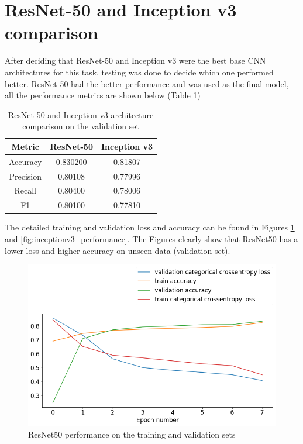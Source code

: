 \documentclass[times, utf8, diplomski]{fer}
\begin{document}
\section{ResNet-50 and Inception v3 comparison}
\label{se:resnet_vs_inception}

After deciding that ResNet-50 and Inception v3 were the best base CNN architectures for this task, testing was done to decide which one performed better. ResNet-50 had the better performance and was used as the final model, all the performance metrics are shown below (Table \ref{tb:resnet_vs_inceptionv3})

\begin{table}
\centering
\caption{ResNet-50 and Inception v3 architecture comparison on the validation set}
\label{tb:resnet_vs_inceptionv3}
\begin{tabular}{ccc}
\hline 
Metric & ResNet-50 & Inception v3 \\ \hline 
Accuracy & 0.830200 & 0.81807 \\ 
Precision & 0.80108 & 0.77996 \\ 
Recall & 0.80400 & 0.78006 \\
F1 & 0.80100 &  0.77810 \\
\hline 
\end{tabular} 
\end{table}

The detailed training and validation loss and accuracy can be found in Figures \ref{fig:resnet_performance} and \ref{fig:inceptionv3_performance}. The Figures clearly show that ResNet50 has a lower loss and higher accuracy on unseen data (validation set).

\begin{figure}
  \includegraphics[scale=0.61]{figures/resnet_performance.png}
  \centering
  \caption{ResNet50 performance on the training and validation sets}
  \label{fig:resnet_performance}
\end{figure}
\end{document}
